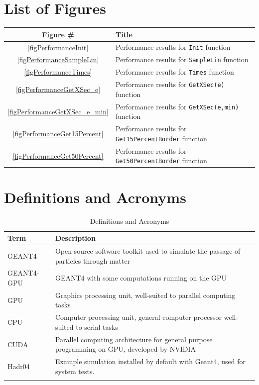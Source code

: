 \documentclass[12pt]{article}
\begin{document}
\section*{List of Figures}
\begin{center}
\begin{tabular}{cl}
\toprule
\bf Figure \# & \bf Title\\\midrule
\ref{figPerformanceInit} & Performance results for \texttt{Init} function\\
\ref{figPerformanceSampleLin} & Performance results for \texttt{SampleLin} function\\
\ref{figPerformanceTimes} & Performance results for \texttt{Times} function\\
\ref{figPerformanceGetXSec_e} & Performance results for \texttt{GetXSec(e)} function\\
\ref{figPerformanceGetXSec_e_min} & Performance results for \texttt{GetXSec(e,min)} function\\
\ref{figPerformanceGet15Percent} & Performance results for \texttt{Get15PercentBorder} function\\
\ref{figPerformanceGet50Percent} & Performance results for \texttt{Get50PercentBorder} function\\
\bottomrule
\end{tabular}
\end{center}

\section*{Definitions and Acronyms} %
\begin{table}[h]
\centering
\caption{Definitions and Acronyms}\label{Table_DefAndAcro}
\begin{tabularx}{\textwidth}{lX}
\toprule
\bf Term & \bf Description\\\midrule
GEANT4 & Open-source software toolkit used to simulate the passage of particles through matter\\
GEANT4-GPU & GEANT4 with some computations running on the GPU\\
GPU & Graphics processing unit, well-suited to parallel computing tasks\\
CPU & Computer processing unit, general computer processor well-suited to serial tasks\\
CUDA & Parallel computing architecture for general purpose programming on GPU, developed by NVIDIA\\
Hadr04 & Example simulation installed by default with Geant4, used for system tests.\\
\Xhline{2\arrayrulewidth}
\end{tabularx}
\end{table}
\end{document}
